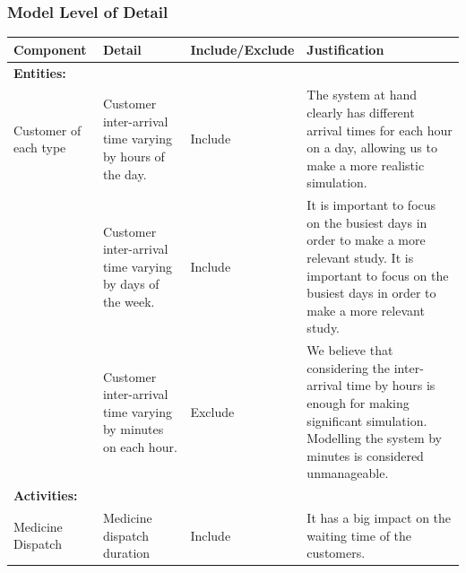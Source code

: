 \subsubsection{Model Level of Detail}
\begin{table}[H]
\centering
\begin{tabular}{p{2cm}p{3cm}lp{6cm}}
\textbf{Component}               & \textbf{Detail}                                              & \textbf{Include/Exclude} & \textbf{Justification}                                                                                                                                                             \\ \hline
\textbf{Entities:}               &                                                              &                          &                                                                                                                                                                           \\
Customer of each type            & Customer inter-arrival time varying by hours of the day.     & Include                  & The system at hand clearly has different arrival times for each hour on a day, allowing us to make a more realistic simulation.                                           \\
                                 & Customer inter-arrival time varying by days of the week.     & Include                  & It is important to focus on the busiest days in order to make a more relevant study. It is important to focus on the busiest days in order to make a more relevant study. \\
                                 & Customer inter-arrival time varying by minutes on each hour. & Exclude                  & We believe that considering the inter-arrival time by hours is enough for making significant simulation. Modelling the system by minutes is considered unmanageable.      \\ \hline
\textbf{Activities:}             &                                                              &                          &                                                                                                                                                                           \\
Medicine Dispatch                & Medicine dispatch duration                                   & Include                  & It has a big impact on the waiting time of the customers.                                                                                                                 \\

\end{tabular}
\end{table}
